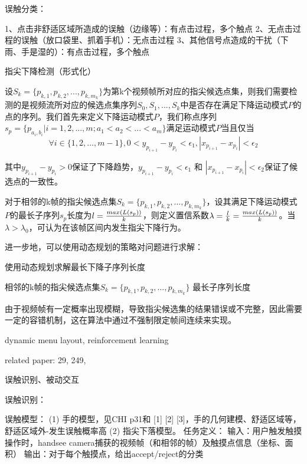 误触分类：

1、点击非舒适区域所造成的误触（边缘等）：有点击过程，多个触点
2、无点击过程的误触（放口袋里、抓着手机）：无点击过程
3、其他信号点造成的干扰（下雨、手是湿的）：有点击过程，多个触点

指尖下降检测（形式化）

设$S_k = \{p_{k,1}, p_{k,2}, ... , p_{k,m_k}\}$为第k个视频帧所对应的指尖候选点集，则我们需要检测的是视频流所对应的候选点集序列$S_0, S_1, ... , S_k$中是否存在满足下降运动模式$P$的点的序列。我们首先来定义下降运动模式$P$，我们称点序列$s_p=\{p_{a_i,b_i}|i=1,2,...,m; a_1 < a_2 < ... < a_m\}$满足运动模式$P$当且仅当$$\forall i \in \{1,2,...,m-1\}, 0 < y_{p_{i+1}} - y_{p_i} < \epsilon_1, |x_{p_{i+1}} - x_{p_i}| < \epsilon_2$$

其中$y_{p_{i+1}} - y_{p_i} > 0$保证了下降趋势，$y_{p_{i+1}} - y_{p_i} < \epsilon_1$ 和 $|x_{p_{i+1}} - x_{p_i}| < \epsilon_2$保证了候选点的一致性。

对于相邻的k帧的指尖候选点集$S_k = \{p_{k,1}, p_{k,2}, ... , p_{k,m_k}\}$，设其满足下降运动模式$P$的最长子序列$s_p$长度为$l={max(L(s_p)) \over k} $，则定义置信系数$\lambda={l \over k}={max(L(s_p)) \over k}$。当$\lambda > \lambda_0$，可认为在该帧区间内发生指尖下降行为。

进一步地，可以使用动态规划的策略对问题进行求解：

\begin{algorithm}
\caption{使用动态规划求解最长下降子序列长度}
\begin{algorithmic}
\Require 相邻的k帧的指尖候选点集$S_k = \{p_{k,1}, p_{k,2}, ... , p_{k,m_k}\}$
\Ensure 最长子序列长度

\end{algorithmic}
\end{algorithm}

由于视频帧有一定概率出现模糊，导致指尖候选集的结果错误或不完整，因此需要一定的容错机制，这在算法中通过不强制限定帧间连续来实现。


dynamic menu layout, reinforcement learning

related paper: 29, 249, 


误触识别、被动交互

误触识别：

误触模型：
    (1) 手的模型，见CHI p31和 [1] [2] [3]，手的几何建模、舒适区域等，舒适区域外-发生误触概率高
    (2) 指尖下落模型。
任务定义：
    输入：用户触发触摸操作时，handsee camera捕获的视频帧（和相邻的帧）及触摸点信息（坐标、面积）
    输出：对于每个触摸点，给出accept/reject的分类

